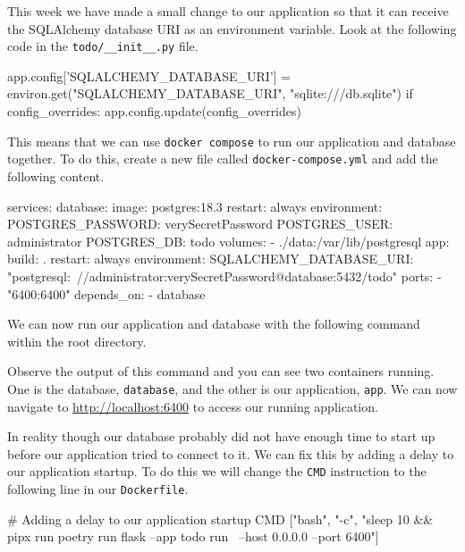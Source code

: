 \documentclass{csse4400}
\begin{document}
This week we have made a small change to our application
so that it can receive the SQLAlchemy database URI as an environment variable.
Look at the following code in the \texttt{todo/\_\_init\_\_.py} file.

\begin{code}[language=python,numbers=none]{}
  app.config['SQLALCHEMY_DATABASE_URI'] = environ.get("SQLALCHEMY_DATABASE_URI",
          "sqlite:///db.sqlite")
  if config_overrides: 
      app.config.update(config_overrides)
\end{code}

This means that we can use \texttt{docker compose} to run our application and database together.
To do this, create a new file called \texttt{docker-compose.yml} and add the following content.

\begin{code}[numbers=none]{}
  services:
    database:
      image: postgres:18.3
      restart: always
      environment:
        POSTGRES_PASSWORD: verySecretPassword
        POSTGRES_USER: administrator
        POSTGRES_DB: todo
      volumes:
        - ./data:/var/lib/postgresql
    app:
      build: .
      restart: always
      environment:
        SQLALCHEMY_DATABASE_URI: "postgresql:\
          //administrator:verySecretPassword@database:5432/todo"
      ports:
        - "6400:6400"
      depends_on:
        - database
\end{code}

We can now run our application and database with the following command within the root directory.


Observe the output of this command and you can see two containers running.
One is the database, \texttt{database}, and the other is our application, \texttt{app}.
We can now navigate to \url{http://localhost:6400} to access our running application.

In reality though our database probably did not have enough time to start up before our application tried to connect to it.
We can fix this by adding a delay to our application startup.
To do this we will change the \texttt{CMD} instruction to the following line in our \texttt{Dockerfile}.

\begin{code}[language=docker,numbers=none]{}
# Adding a delay to our application startup
CMD ["bash", "-c", "sleep 10 && pipx run poetry run flask --app todo run \
     --host 0.0.0.0 --port 6400"]
\end{code}
\end{document}
